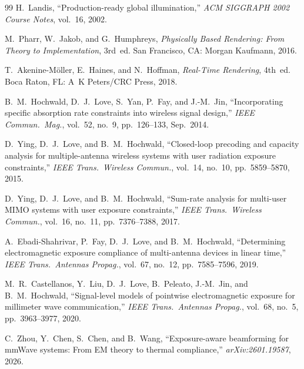 \documentclass[11pt,a4paper]{article}
\theoremstyle{definition}      %
\begin{document}
\begin{thebibliography}{99}
  H.~Landis, ``Production-ready global illumination,'' \textit{ACM SIGGRAPH
  2002 Course Notes}, vol.~16, 2002.

  M.~Pharr, W.~Jakob, and G.~Humphreys, \textit{Physically Based Rendering:
  From Theory to Implementation}, 3rd~ed. San Francisco, CA: Morgan Kaufmann,
  2016.

  T.~Akenine-M\"{o}ller, E.~Haines, and N.~Hoffman, \textit{Real-Time
  Rendering}, 4th~ed. Boca Raton, FL: A~K Peters/CRC Press, 2018.

  B.~M.~Hochwald, D.~J.~Love, S.~Yan, P.~Fay, and J.-M.~Jin, ``Incorporating
  specific absorption rate constraints into wireless signal design,''
  \textit{IEEE Commun.\ Mag.}, vol.~52, no.~9, pp.~126--133, Sep.\ 2014.

  D.~Ying, D.~J.~Love, and B.~M.~Hochwald, ``Closed-loop precoding and
  capacity analysis for multiple-antenna wireless systems with user radiation
  exposure constraints,'' \textit{IEEE Trans.\ Wireless Commun.}, vol.~14,
  no.~10, pp.~5859--5870, 2015.

  D.~Ying, D.~J.~Love, and B.~M.~Hochwald, ``Sum-rate analysis for multi-user
  MIMO systems with user exposure constraints,'' \textit{IEEE Trans.\ Wireless
  Commun.}, vol.~16, no.~11, pp.~7376--7388, 2017.

  A.~Ebadi-Shahrivar, P.~Fay, D.~J.~Love, and B.~M.~Hochwald, ``Determining
  electromagnetic exposure compliance of multi-antenna devices in linear
  time,'' \textit{IEEE Trans.\ Antennas Propag.}, vol.~67, no.~12,
  pp.~7585--7596, 2019.

  M.~R.~Castellanos, Y.~Liu, D.~J.~Love, B.~Peleato, J.-M.~Jin, and
  B.~M.~Hochwald, ``Signal-level models of pointwise electromagnetic exposure
  for millimeter wave communication,'' \textit{IEEE Trans.\ Antennas Propag.},
  vol.~68, no.~5, pp.~3963--3977, 2020.

  C.~Zhou, Y.~Chen, S.~Chen, and B.~Wang, ``Exposure-aware beamforming for
  mmWave systems: From EM theory to thermal compliance,''
  \textit{arXiv:2601.19587}, 2026.


\end{thebibliography}
\end{document}
